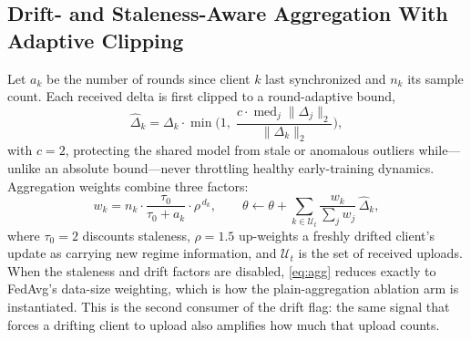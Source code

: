\documentclass[journal]{IEEEtran}
\begin{document}
\subsection{Drift- and Staleness-Aware Aggregation With Adaptive Clipping}\label{sec:agg}
Let $a_k$ be the number of rounds since client $k$ last synchronized and $n_k$ its sample count. Each received delta is first clipped to a round-adaptive bound,
\begin{equation}\label{eq:clip}
\hat{\Delta}_k = \Delta_k \cdot \min\!\Big(1,\; \frac{c \cdot \operatorname{med}_j \lVert \Delta_j \rVert_2}{\lVert \Delta_k \rVert_2}\Big),
\end{equation}
with $c = 2$, protecting the shared model from stale or anomalous outliers while---unlike an absolute bound---never throttling healthy early-training dynamics. Aggregation weights combine three factors:
\begin{equation}\label{eq:agg}
w_k = n_k \cdot \frac{\tau_0}{\tau_0 + a_k} \cdot \rho^{\,d_k}, \qquad \theta \leftarrow \theta + \sum_{k \in \mathcal{U}_t} \frac{w_k}{\sum_j w_j}\, \hat{\Delta}_k,
\end{equation}
where $\tau_0 = 2$ discounts staleness, $\rho = 1.5$ up-weights a freshly drifted client's update as carrying new regime information, and $\mathcal{U}_t$ is the set of received uploads. When the staleness and drift factors are disabled, \eqref{eq:agg} reduces exactly to FedAvg's data-size weighting, which is how the plain-aggregation ablation arm is instantiated. This is the second consumer of the drift flag: the same signal that forces a drifting client to upload also amplifies how much that upload counts.
\end{document}
